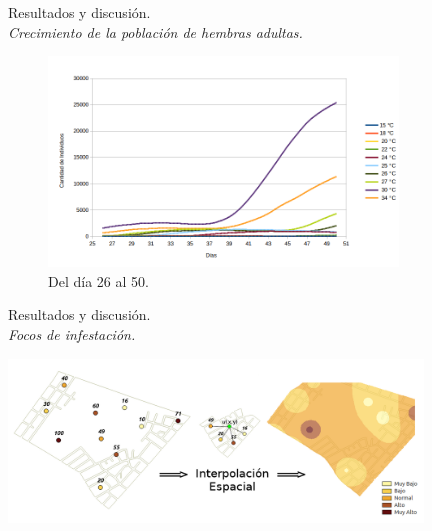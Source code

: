 \begin{frame}[t]{Resultados y discusión.\\\textit{Crecimiento de la población de hembras adultas.}}
\begin{figure}
    \includegraphics[width=9.3cm]{./graphics/poblacion-adulto-p2.png}
    \caption{Del día 26 al 50.}
\end{figure}
\end{frame}



\begin{frame}[t]{Resultados y discusión.\\\textit{Focos de infestación.}}
\begin{center}
    \includegraphics[width=11cm]{./graphics/identificacion-focos.png}
\end{center}
\end{frame}

